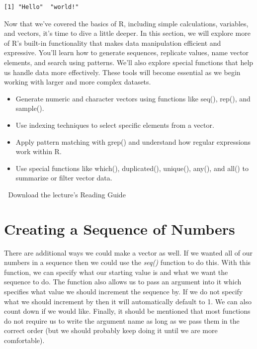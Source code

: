 \documentclass[
  letterpaper,
  DIV=11,
  numbers=noendperiod]{scrreprt}
\providecommand{\tightlist}{%
  \setlength{\itemsep}{0pt}\setlength{\parskip}{0pt}}
\begin{document}
\begin{verbatim}
[1] "Hello"  "world!"
\end{verbatim}

Now that we've covered the basics of R, including simple calculations,
variables, and vectors, it's time to dive a little deeper. In this
section, we will explore more of R's built-in functionality that makes
data manipulation efficient and expressive. You'll learn how to generate
sequences, replicate values, name vector elements, and search using
patterns. We'll also explore special functions that help us handle data
more effectively. These tools will become essential as we begin working
with larger and more complex datasets.

\begin{itemize}
\tightlist
\item
  Generate numeric and character vectors using functions like seq(),
  rep(), and sample().
\item
  Use indexing techniques to select specific elements from a vector.
\item
  Apply pattern matching with grep() and understand how regular
  expressions work within R.
\item
  Use special functions like which(), duplicated(), unique(), any(), and
  all() to summarize or filter vector data.
\end{itemize}

\begin{tcolorbox}[enhanced jigsaw, colframe=quarto-callout-tip-color-frame, colback=white, breakable, rightrule=.15mm, title=\textcolor{quarto-callout-tip-color}{\faLightbulb}\hspace{0.5em}{Supplemental Material}, bottomtitle=1mm, toptitle=1mm, titlerule=0mm, left=2mm, coltitle=black, colbacktitle=quarto-callout-tip-color!10!white, leftrule=.75mm, opacitybacktitle=0.6, bottomrule=.15mm, opacityback=0, arc=.35mm, toprule=.15mm]

📄 Download the lecture's Reading Guide

\end{tcolorbox}

\section{Creating a Sequence of
Numbers}\label{creating-a-sequence-of-numbers}

There are additional ways we could make a vector as well. If we wanted
all of our numbers in a sequence then we could use the \emph{seq()}
function to do this. With this function, we can specify what our
starting value is and what we want the sequence to do. The function also
allows us to pass an argument into it which specifies what value we
should increment the sequence by. If we do not specify what we should
increment by then it will automatically default to 1. We can also count
down if we would like. Finally, it should be mentioned that most
functions do not require us to write the argument name as long as we
pass them in the correct order (but we should probably keep doing it
until we are more comfortable).
\end{document}
